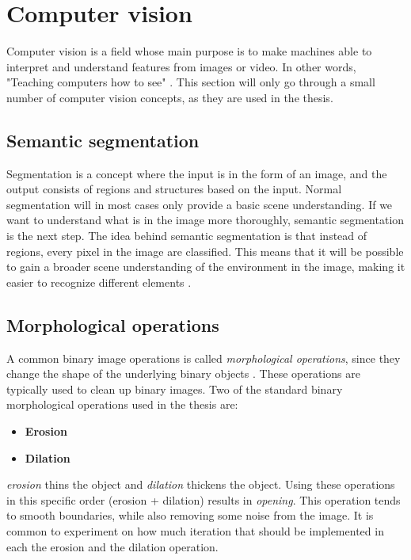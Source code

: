 \documentclass[USenglish]{ifimaster}  %
\begin{document}
\section{Computer vision}
Computer vision is a field whose main purpose is to make machines able to interpret and understand features from images or video. In other words, "Teaching computers how to see" \cite{website:maskinsyn-intro}. This section will only go through a small number of computer vision concepts, as they are used in the thesis.

\subsection{Semantic segmentation}
Segmentation is a concept where the input is in the form of an image, and the output consists of regions and structures based on the input. Normal segmentation will in most cases only provide a basic scene understanding. If we want to understand what is in the image more thoroughly, semantic segmentation is the next step. The idea behind semantic segmentation is that instead of regions, every pixel in the image are classified. This means that it will be possible to gain a broader scene understanding of the environment in the image, making it easier to recognize different elements \cite{website:semantic_segmentation}.

\subsection{Morphological operations}
A common binary image operations is called \textit{morphological operations}, since
they change the shape of the underlying binary objects \cite{Ritter}. These operations are typically used to clean up binary images. Two of the standard binary morphological operations used in the thesis are: 
\newline
\begin{itemize}
    \item \textbf{Erosion}
    \item \textbf{Dilation}
\end{itemize}

\textit{erosion} thins the object and \textit{dilation} thickens the object. Using these operations in this specific order (erosion + dilation) results in \textit{opening}. This operation tends to smooth boundaries, while also removing some noise from the image. It is common to experiment on how much iteration that should be implemented in each the erosion and the dilation operation.
\end{document}
